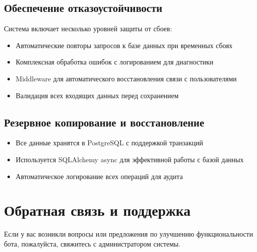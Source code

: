 \documentclass[a4paper,12pt]{article}
\begin{document}
\subsection{Обеспечение отказоустойчивости}
Система включает несколько уровней защиты от сбоев:
\begin{itemize}
    \item Автоматические повторы запросов к базе данных при временных сбоях
    \item Комплексная обработка ошибок с логированием для диагностики
    \item Middleware для автоматического восстановления связи с пользователями
    \item Валидация всех входящих данных перед сохранением
\end{itemize}

\subsection{Резервное копирование и восстановление}
\begin{itemize}
    \item Все данные хранятся в PostgreSQL с поддержкой транзакций
    \item Используется SQLAlchemy async для эффективной работы с базой данных
    \item Автоматическое логирование всех операций для аудита
\end{itemize}

\section{Обратная связь и поддержка}

Если у вас возникли вопросы или предложения по улучшению функциональности бота, пожалуйста, свяжитесь с администратором системы.
\end{document}
